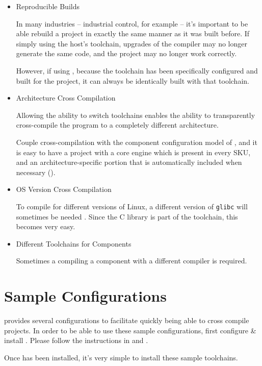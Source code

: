 \begin{itemize}
\item Reproducible Builds

  In many industries -- industrial control, for example -- it's
  important to be able rebuild a project in exactly the same manner as
  it was built before.  If simply using the host's toolchain, upgrades
  of the compiler may no longer generate the same code, and the
  project may no longer work correctly.

  However, if using \lmsbw, because the toolchain has been
  specifically configured and built for the project, it can always be
  identically built with that toolchain.

\item Architecture Cross Compilation

  Allowing the ability to switch toolchains enables the ability to
  transparently cross-compile the program to a completely different
  architecture.

  Couple cross-compilation with the component configuration model of
  \lmsbw, and it is easy to have a project with a core engine which is
  present in every SKU, and an architecture-specific portion that is
  automatically included when necessary
  ().

\item{OS Version Cross Compilation}

  To compile for different versions of Linux, a different version of
  \texttt{glibc} will sometimes be needed .  Since the C library is
  part of the toolchain, this becomes very easy.

\item Different Toolchains for Components

  Sometimes a compiling a component with a different compiler is
  required.
\end{itemize}

\section{Sample Configurations}

\lmsbw provides several \ctng configurations to facilitate quickly
being able to cross compile projects.  In order to be able to use
these sample configurations, first configure \& install \ctng.  Please
follow the instructions in  and
.

Once \ctng has been installed, it's very simple to install these
sample toolchains.


